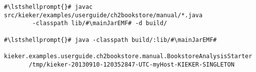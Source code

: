 \begin{lstlisting}[caption=Commands to compile and run the analysis under \UnixLikeSystems{},label=lst:bookstoreAnalysisStarterLinux] 			
#\lstshellprompt{}# javac src/kieker/examples/userguide/ch2bookstore/manual/*.java 
        -classpath lib/#\mainJarEMF# -d build/

#\lstshellprompt{}# java -classpath build/:lib/#\mainJarEMF#
       kieker.examples.userguide.ch2bookstore.manual.BookstoreAnalysisStarter 
       /tmp/kieker-20130910-120352847-UTC-myHost-KIEKER-SINGLETON
\end{lstlisting}	